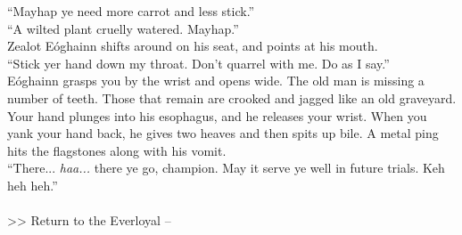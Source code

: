 “Mayhap ye need more carrot and less stick.”\\

“A wilted plant cruelly watered. Mayhap.”\\

Zealot Eóghainn shifts around on his seat, and points at his mouth.\\

“Stick yer hand down my throat. Don’t quarrel with me. Do as I say.”\\

Eóghainn grasps you by the wrist and opens wide. The old man is missing a number of teeth. Those that remain are crooked and jagged like an old graveyard.\\

Your hand plunges into his esophagus, and he releases your wrist. When you yank your hand back, he gives two heaves and then spits up bile. A metal ping hits the flagstones along with his vomit.\\

“There... \emph{haa...} there ye go, champion. May it serve ye well in future trials. Keh heh heh.”\\
\\

>>  Return to the Everloyal -- 
